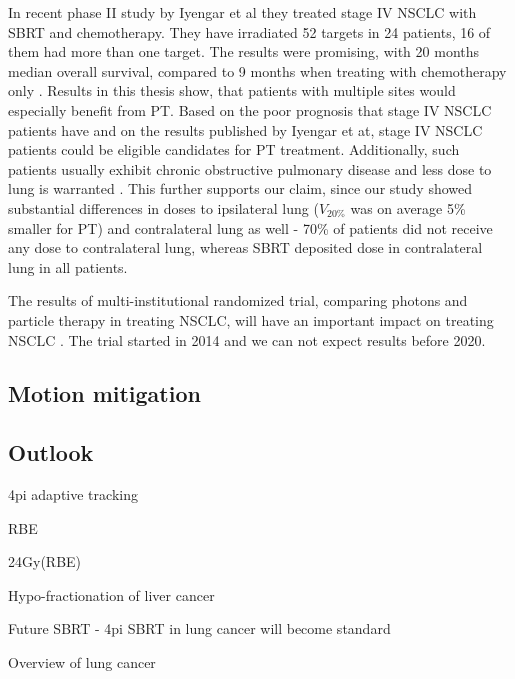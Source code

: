 \documentclass[type=dr, dr=rernat, accentcolor=tud7b,colorbacktitle, bigchapter, openright, twoside, 12pt ]{tudthesis}
\begin{document}
In recent phase II study by Iyengar et al \cite{Iyengar2014} they treated stage IV NSCLC with SBRT and chemotherapy. They have irradiated 52 targets in 24 patients, 16 of them had more than one target. The results were promising, with 20 months median overall survival, 
compared to 9 months when treating with chemotherapy only \cite{Tsao2008}. Results in this thesis show, that patients with multiple sites would especially benefit from PT. Based on the poor prognosis that stage IV NSCLC patients have and on the results published by Iyengar et at,
stage IV NSCLC patients could be eligible candidates for PT treatment. Additionally, such patients usually exhibit chronic obstructive pulmonary disease and less dose to lung is warranted \cite{Westover2012}. This further supports our claim, since our study showed substantial differences in 
doses to ipsilateral lung ($V_{20\%}$ was on average 5\% smaller for PT) and contralateral lung as well - 70\% of patients did not receive any dose to contralateral lung, whereas SBRT deposited dose in contralateral lung in all patients.

The results of multi-institutional randomized trial, comparing photons and particle therapy in treating NSCLC, will have an important impact on treating NSCLC \cite{RTOG1308}. The trial started in 2014 and we can not expect results before 2020.

\subsection{Motion mitigation}


\subsection{Outlook}


4pi
adaptive
tracking



RBE

24Gy(RBE) %

Hypo-fractionation of liver cancer %

Future SBRT - 4pi %
SBRT in lung cancer will become standard 

Overview of lung cancer %
\end{document}
